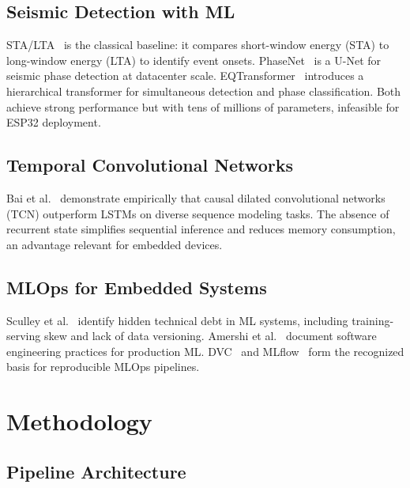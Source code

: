 \documentclass[conference]{IEEEtran}
\begin{document}
\subsection{Seismic Detection with ML}

STA/LTA~\cite{allen1978automatic,withers1998comparison} is the classical
baseline: it compares short-window energy (STA) to long-window energy (LTA)
to identify event onsets.
PhaseNet~\cite{zhu2019phasenet} is a U-Net for seismic phase detection at
datacenter scale.
EQTransformer~\cite{mousavi2020earthquake} introduces a hierarchical
transformer for simultaneous detection and phase classification.
Both achieve strong performance but with tens of millions of parameters,
infeasible for ESP32 deployment.

\subsection{Temporal Convolutional Networks}

Bai et al.~\cite{bai2018empirical} demonstrate empirically that causal dilated
convolutional networks (TCN) outperform LSTMs on diverse sequence modeling tasks.
The absence of recurrent state simplifies sequential inference and reduces
memory consumption, an advantage relevant for embedded devices.

\subsection{MLOps for Embedded Systems}

Sculley et al.~\cite{sculley2015hidden} identify hidden technical debt in ML
systems, including training-serving skew and lack of data versioning.
Amershi et al.~\cite{amershi2019software} document software engineering
practices for production ML.
DVC~\cite{dvc} and MLflow~\cite{mlflow} form the recognized basis for
reproducible MLOps pipelines.

\section{Methodology}
\label{sec:method}

\subsection{Pipeline Architecture}
\end{document}
